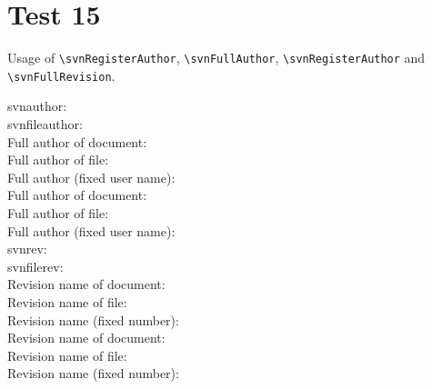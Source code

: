 \documentclass[12pt]{report}
\begin{document}
\chapter{Test 15}
Usage of \verb+\svnRegisterAuthor+, \verb+\svnFullAuthor+,
\verb+\svnRegisterAuthor+ and \verb+\svnFullRevision+.

\noindent
svnauthor: \svnauthor\\
svnfileauthor: \svnfileauthor\\

\noindent
Full author of document: \svnFullAuthor{\svnauthor}\\
Full author of file: \svnFullAuthor{\svnfileauthor}\\
Full author (fixed user name): \\

\noindent
Full author of document: \svnFullAuthor*{\svnauthor}\\
Full author of file: \svnFullAuthor*{\svnfileauthor}\\
Full author (fixed user name): \\

\noindent
svnrev: \svnrev\\
svnfilerev: \svnfilerev\\

\noindent
Revision name of document: \svnFullRevision{\svnrev}\\
Revision name of file: \svnFullRevision{\svnfilerev}\\
Revision name (fixed number): \\

\noindent
Revision name of document: \svnFullRevision*{\svnrev}\\
Revision name of file: \svnFullRevision*{\svnfilerev}\\
Revision name (fixed number): \\
\end{document}
